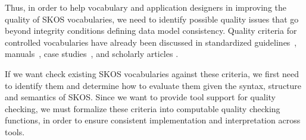 Thus, in order to help vocabulary and application designers in improving the quality of SKOS vocabularies, we need to identify possible quality issues that go beyond integrity conditions defining data model consistency. Quality criteria for controlled vocabularies have already been discussed in standardized guidelines~\cite{ISO25964-1:2011,Z39.19:2005}, manuals~\cite{Svenonius2003,Hedden2010,Aitchison2000,Harpring2010}, case studies~\cite{Soergel1995}, and scholarly articles \cite{Coronado2009,Soergel1997,Soergel2002,Elkin2002,Kless2010}. 







If we want check existing SKOS vocabularies against these criteria, we first need to identify them and determine how to evaluate them given the syntax, structure and semantics of SKOS. Since we want to provide tool support for quality checking, we must formalize these criteria into computable quality checking functions, in order to ensure consistent implementation and interpretation across tools.

